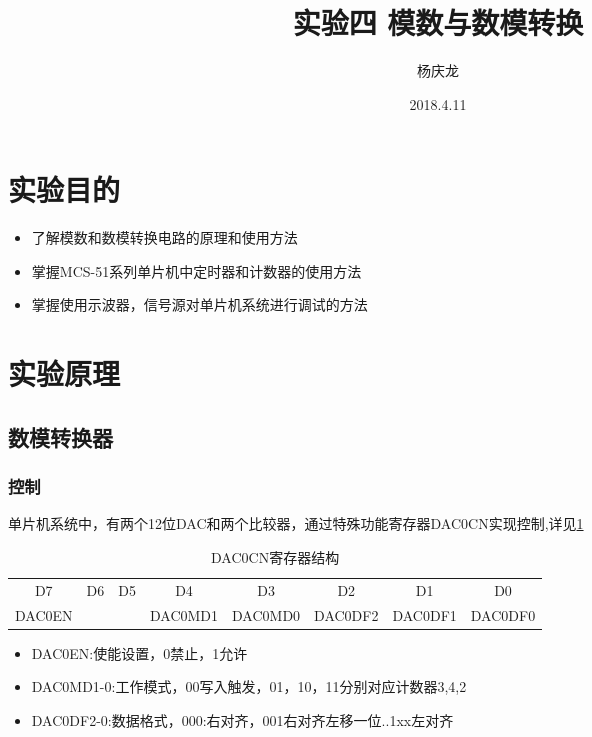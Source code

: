\documentclass{article}
\begin{document}

\begin{CJK}{UTF8}{gkai}


\title{实验四 模数与数模转换}
\author{杨庆龙}
\date{2018.4.11}
\maketitle

\section{实验目的}
\begin{itemize}
	\item 了解模数和数模转换电路的原理和使用方法
	\item 掌握MCS-51系列单片机中定时器和计数器的使用方法
	\item 掌握使用示波器，信号源对单片机系统进行调试的方法
\end{itemize}
\vspace{3mm}

\section{实验原理}
\subsection{数模转换器}
\subsubsection{控制}
单片机系统中，有两个12位DAC和两个比较器，通过特殊功能寄存器DAC0CN实现控制,详见\ref{table_DAC0CN}
\begin{table}[!htbp]
  \centering
  \caption{DAC0CN寄存器结构}
  \label{table_DAC0CN}
\begin{tabular}{|c|c|c|c|c|c|c|c|}
  \hline
  D7&D6&D5&D4&D3&D2&D1&D0\\
  DAC0EN&&&DAC0MD1&DAC0MD0&DAC0DF2&DAC0DF1&DAC0DF0\\
	\hline
\end{tabular}
\end{table}
\begin{itemize}
  \item DAC0EN:使能设置，0禁止，1允许
  \item DAC0MD1-0:工作模式，00写入触发，01，10，11分别对应计数器3,4,2
  \item DAC0DF2-0:数据格式，000:右对齐，001右对齐左移一位..1xx左对齐
\end{itemize}

\end{CJK}
\end{document}
